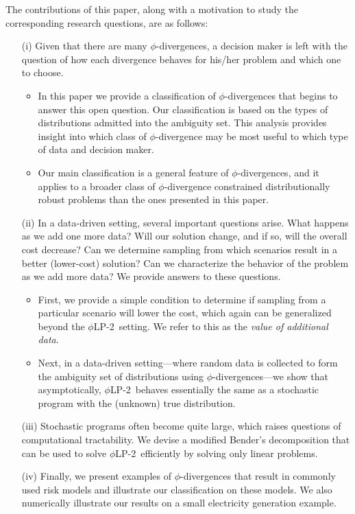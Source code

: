 \documentclass[opre,nonblindrev]{informs3} %
\newcommand{\plp}{$\phi$LP-2}
\begin{document}
The contributions of this paper, along with a motivation to study the corresponding research questions, are as follows:
\begin{itemize}
\item[(i)] 
Given that there are many $\phi$-divergences, a decision maker is left with the question of how each divergence behaves for his/her problem and which one to choose.
	\begin{itemize}
		\item In this paper we provide a classification of $\phi$-divergences that begins to answer this open question.
Our classification is based on the types of distributions admitted into the ambiguity set.
This analysis provides insight into which class of $\phi$-divergence may be most useful to which type of data and decision maker.
\item Our main classification is a general feature of $\phi$-divergences, and it applies to a broader class of $\phi$-divergence constrained distributionally robust problems than the ones presented in this paper. 
\end{itemize}

\item[(ii)] In a data-driven setting, several important questions arise.
		What happens as we add one more data?
		Will our solution change, and if so, will the overall cost decrease?
		Can we determine sampling from which scenarios result in a better (lower-cost) solution?
		Can we characterize the behavior of the problem as we add more data?
		We provide answers to these questions.

		\begin{itemize}
			\item First, we provide a simple condition to determine if sampling from a particular scenario will lower the cost, which again can be generalized beyond the \plp\ setting.
		We refer to this as the {\it value of additional data}. 
			\item Next, in a data-driven setting---where random data is collected to form the ambiguity set of distributions using $\phi$-divergences---we show that asymptotically, \plp\  behaves essentially the same as a stochastic program with the (unknown) true distribution.
		\end{itemize}


\item[(iii)] Stochastic programs often become quite large, which raises questions of computational tractability.
		We devise a modified Bender's decomposition that can be used to solve \plp\ efficiently by solving only linear problems. 

\item[(iv)]   Finally, we present examples of $\phi$-divergences that result in commonly used risk models and illustrate our classification on these models. 
We also numerically illustrate our results on a small electricity generation example. 
\end{itemize}
\smallskip 
\end{document}
